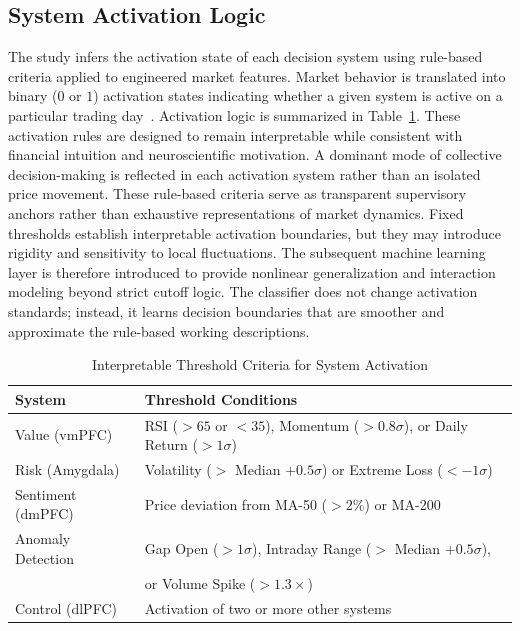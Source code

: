 \documentclass[runningheads,10pt]{llncs}
\begin{document}
\subsection{System Activation Logic}
The study infers the activation state of each decision system using rule-based criteria applied to engineered market features. Market behavior is translated into binary ($0$ or $1$) activation states indicating whether a given system is active on a particular trading day~\cite{lo2004,kahneman1979}. Activation logic is summarized in Table~\ref{tab:activation}. These activation rules are designed to remain interpretable while consistent with financial intuition and neuroscientific motivation. A dominant mode of collective decision-making is reflected in each activation system rather than an isolated price movement. These rule-based criteria serve as transparent supervisory anchors rather than exhaustive representations of market dynamics. Fixed thresholds establish interpretable activation boundaries, but they may introduce rigidity and sensitivity to local fluctuations. The subsequent machine learning layer is therefore introduced to provide nonlinear generalization and interaction modeling beyond strict cutoff logic. The classifier does not change activation standards; instead, it learns decision boundaries that are smoother and approximate the rule-based working descriptions.
\small
\begin{table}[ht]
\caption{Interpretable Threshold Criteria for System Activation}\label{tab:activation}
\centering
\begin{tabular}{ll}
\toprule
\textbf{System} & \textbf{Threshold Conditions} \\
\midrule
Value (vmPFC)      & RSI ($>65$ or $<35$), Momentum ($>0.8\sigma$), or Daily Return ($>1\sigma$) \\
Risk (Amygdala)    & Volatility ($>$ Median $+ 0.5\sigma$) or Extreme Loss ($< -1\sigma$) \\
Sentiment (dmPFC)  & Price deviation from MA-50 ($>2\%$) or MA-200 \\
Anomaly Detection  & Gap Open ($>1\sigma$), Intraday Range ($>$ Median $+ 0.5\sigma$), \\
                   & or Volume Spike ($>1.3\times$) \\
Control (dlPFC)    & Activation of two or more other systems \\
\bottomrule
\end{tabular}
\end{table}
\end{document}
